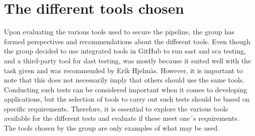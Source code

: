 \section{The different tools chosen}
Upon evaluating the various tools used to secure the pipeline, the group has formed perspectives and recommendations about the different tools. Even though the group decided to use integrated tools in GitHub to run \acrfull{sast} and \acrshort{sca} testing, and a third-party tool for \acrshort{dast} testing, was mostly because it suited well with the task given and was recommended by Erik Hjelmås. However, it is important to note that this does not necessarily imply that others should use the same tools. Conducting such tests can be considered important when it comes to developing applications, but the selection of tools to carry out such tests should be based on specific requirements. Therefore, it is essential to explore the various tools available for the different tests and evaluate if these meet one´s requirements. The tools chosen by the group are only examples of what may be used. 


